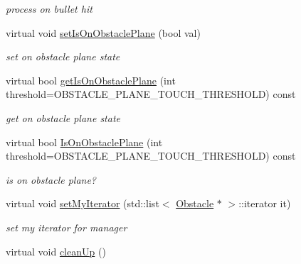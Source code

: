 \begin{DoxyCompactItemize}
\begin{DoxyCompactList}\small\item\em process on bullet hit \end{DoxyCompactList}\item 
virtual void \hyperlink{class_n_c_t_u_1_1_obstacle_a156ca87f893b7ff453a5180a27564e0b}{set\+Is\+On\+Obstacle\+Plane} (bool val)\hypertarget{class_n_c_t_u_1_1_obstacle_a156ca87f893b7ff453a5180a27564e0b}{}\label{class_n_c_t_u_1_1_obstacle_a156ca87f893b7ff453a5180a27564e0b}

\begin{DoxyCompactList}\small\item\em set on obstacle plane state \end{DoxyCompactList}\item 
virtual bool \hyperlink{class_n_c_t_u_1_1_obstacle_a97c1418cc9898305b231c3cc77aae307}{get\+Is\+On\+Obstacle\+Plane} (int threshold=O\+B\+S\+T\+A\+C\+L\+E\+\_\+\+P\+L\+A\+N\+E\+\_\+\+T\+O\+U\+C\+H\+\_\+\+T\+H\+R\+E\+S\+H\+O\+LD) const \hypertarget{class_n_c_t_u_1_1_obstacle_a97c1418cc9898305b231c3cc77aae307}{}\label{class_n_c_t_u_1_1_obstacle_a97c1418cc9898305b231c3cc77aae307}

\begin{DoxyCompactList}\small\item\em get on obstacle plane state \end{DoxyCompactList}\item 
virtual bool \hyperlink{class_n_c_t_u_1_1_obstacle_a643dc58d043d26db4e1029e5c3c478db}{Is\+On\+Obstacle\+Plane} (int threshold=O\+B\+S\+T\+A\+C\+L\+E\+\_\+\+P\+L\+A\+N\+E\+\_\+\+T\+O\+U\+C\+H\+\_\+\+T\+H\+R\+E\+S\+H\+O\+LD) const \hypertarget{class_n_c_t_u_1_1_obstacle_a643dc58d043d26db4e1029e5c3c478db}{}\label{class_n_c_t_u_1_1_obstacle_a643dc58d043d26db4e1029e5c3c478db}

\begin{DoxyCompactList}\small\item\em is on obstacle plane? \end{DoxyCompactList}\item 
virtual void \hyperlink{class_n_c_t_u_1_1_obstacle_ad081dc72bebac094289d949bf98ee3be}{set\+My\+Iterator} (std\+::list$<$ \hyperlink{class_n_c_t_u_1_1_obstacle}{Obstacle} $\ast$ $>$\+::iterator it)\hypertarget{class_n_c_t_u_1_1_obstacle_ad081dc72bebac094289d949bf98ee3be}{}\label{class_n_c_t_u_1_1_obstacle_ad081dc72bebac094289d949bf98ee3be}

\begin{DoxyCompactList}\small\item\em set my iterator for manager \end{DoxyCompactList}\item 
virtual void \hyperlink{class_n_c_t_u_1_1_obstacle_ac1ec2583dbf455a82c7f4a9566c31f48}{clean\+Up} ()\hypertarget{class_n_c_t_u_1_1_obstacle_ac1ec2583dbf455a82c7f4a9566c31f48}{}\label{class_n_c_t_u_1_1_obstacle_ac1ec2583dbf455a82c7f4a9566c31f48}


\end{DoxyCompactItemize}
